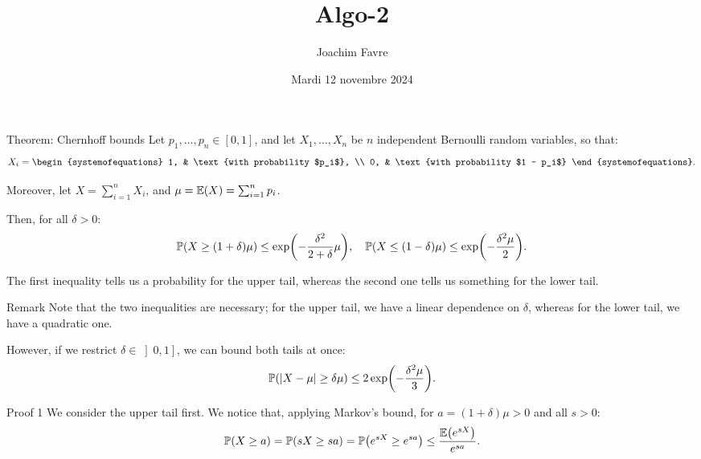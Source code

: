 \documentclass[a4paper]{article}
\title{Algo-2}
\author{Joachim Favre}
\date{Mardi 12 novembre 2024}
\begin{document}
\maketitle


\begin{parag}{Theorem: Chernhoff bounds}
    Let $p_1, \ldots, p_n \in \left[0, 1\right]$, and let $X_1, \ldots, X_n$ be $n$ independent Bernoulli random variables, so that: 
    \[X_i = \begin{systemofequations} 1, & \text{with probability $p_i$}, \\ 0, & \text{with probability $1 - p_i$} \end{systemofequations}.\]

    Moreover, let $X = \sum_{i=1}^{n} X_i$, and $\mu = \exval\left(X\right) = \sum_{i=1}^{n} p_i$.

    Then, for all $\delta > 0$: 
    \[\prob\left(X \geq \left(1 + \delta\right) \mu\right) \leq \exp\left(-\frac{\delta^2}{2 + \delta} \mu\right), \mathspace \prob\left(X \leq \left(1 - \delta\right) \mu\right) \leq \exp\left(- \frac{\delta^2 \mu}{2}\right).\]

    The first inequality tells us a probability for the upper tail, whereas the second one tells us something for the lower tail. 
    
    \begin{subparag}{Remark}
        Note that the two inequalities are necessary; for the upper tail, we have a linear dependence on $\delta$, whereas for the lower tail, we have a quadratic one.

        However, if we restrict $\delta \in \left]0, 1\right] $, we can bound both tails at once: 
        \[\prob\left(\left|X - \mu\right| \geq \delta \mu\right) \leq 2 \exp\left(-\frac{\delta^2 \mu}{3}\right).\]
    \end{subparag}

    \begin{subparag}{Proof 1}
        We consider the upper tail first. We notice that, applying Markov's bound, for $a = \left(1 + \delta\right) \mu > 0$ and all $s > 0$: 
        \[\prob\left(X \geq a\right) = \prob\left(sX \geq sa\right) = \prob\left(e^{sX} \geq e^{sa}\right) \leq \frac{\exval\left(e^{s X}\right)}{e^{sa}}.\]


\end{subparag}
\end{parag}
\end{document}
